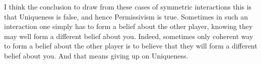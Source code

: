 \documentclass[
  12pt,
  letterpaper,
  DIV=11,
  numbers=noendperiod]{scrreprt}
\begin{document}
I think the conclusion to draw from these cases of symmetric
interactions this is that Uniqueness is false, and hence Permissivism is
true. Sometimes in such an interaction one simply has to form a belief
about the other player, knowing they may well form a different belief
about you. Indeed, sometimes only coherent way to form a belief about
the other player is to believe that they will form a different belief
about you. And that means giving up on Uniqueness.
\end{document}
